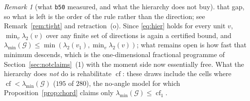 \documentclass[11pt]{article}
\theoremstyle{remark}
\newtheorem{remark}{Remark}[section]
\newcommand{\Gr}{\mathcal{G}}
\begin{document}
\begin{remark}[what \texttt{b50} measured, and what the hierarchy does not buy]
that gap, so what is left is the order of the rule rather than the direction; see
Remark~\ref{rem:tight} and retraction~(o). Since \eqref{eq:hier} holds for every unit $v$,
$\min_v\lambda_2(v)$ over any finite set of directions is again a certified bound, and
$\lambda_{\min}(\Gr)\le\min(\lambda_2(v_1),\min_v\lambda_2(v))$; what remains open is how fast that
minimum descends, which is the one-dimensional fractional programme of
Section~\ref{sec:notclaims}~(1) with the moment side now essentially free. What the hierarchy does
\emph{not} do is rehabilitate $\operatorname{cf}$: these draws include the cells where
$\operatorname{cf}<\lambda_{\min}(\Gr)$ ($195$ of $280$), the no-angle model for which
Proposition~\ref{prop:chord} claims only $\lambda_{\min}(\Gr)\le\operatorname{cf}_1$.
\end{remark}
\end{document}
